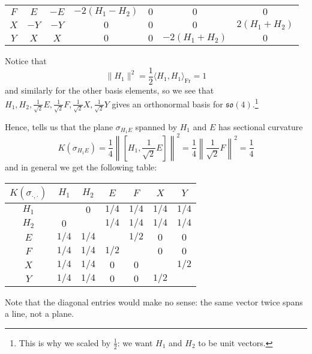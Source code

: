 \begin{example}
\begin{center}
\begin{tabular}{c|cccccc}
			$F$ & $E$ & $-E$ & $-2(H_1-H_2)$ & $0$ & $ 0$ & $0$ \\
			$X$ & $-Y$ & $-Y$ & $0$ & $0$ & $0$ & $2(H_1+H_2)$ \\
			$Y$ & $X$ & $X$ & $0$ & $0$ & $-2(H_1+H_2)$ & $0$ 
		\end{tabular}
	\end{center}
	Notice that
	\[
		\|H_1\|^2 = \frac{1}{2} \langle H_1, H_1 \rangle_{\text{Fr}} = 1
	\]
	and similarly for the other basis elements, so we see that $H_1, H_2, \frac{1}{\sqrt{2}}E, \frac{1}{\sqrt{2}}F, \frac{1}{\sqrt{2}}X, \frac{1}{\sqrt{2}}Y$ gives an orthonormal basis for $\mathfrak{so}(4)$.\footnote{This is why we scaled by $\frac{1}{2}$: we want $H_1$ and $H_2$ to be unit vectors.} 
	
	Hence,  tells us that the plane $\sigma_{H_1E}$ spanned by $H_1$ and $E$ has sectional curvature
	\[
		K(\sigma_{H_1E}) = \frac{1}{4}\left\|\left[H_1,\frac{1}{\sqrt{2}}E\right]\right\|^2 = \frac{1}{4}\left\|\frac{1}{\sqrt{2}}F\right\|^2 = \frac{1}{4}
	\]
	and in general we get the following table:
	\begin{center}
		\begin{tabular}{c|cccccc}
			$K(\sigma_{\cdot, \cdot})$ & $H_1$ & $H_2$ & $E$ & $F$ & $X$ & $Y$ \\
			\hline
			$H_1$ &  & $0$ & $1/4$ & $1/4$ & $1/4$ & $1/4$ \\
			$H_2$ & $0$ &  & $1/4$ & $1/4$ & $1/4$ & $1/4$ \\
			$E$ & $1/4$ & $1/4$ &  & $1/2$ & $0$ & $0$ \\
			$F$ & $1/4$ & $1/4$ & $1/2$ &  & $ 0$ & $0$ \\
			$X$ & $1/4$ & $1/4$ & $0$ & $0$ &  & $1/2$ \\
			$Y$ & $1/4$ & $1/4$ & $0$ & $0$ & $1/2$ & 
		\end{tabular}
	\end{center}
	Note that the diagonal entries would make no sense: the same vector twice spans a line, not a plane.
\end{example}